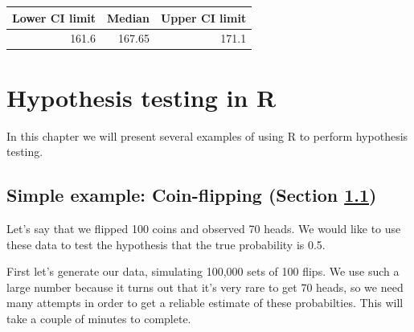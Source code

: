 \documentclass[
  12pt,
]{book}
\begin{document}
\begin{tabular}{r|r|r}
\hline
Lower CI limit & Median & Upper CI limit\\
\hline
161.6 & 167.65 & 171.1\\
\hline
\end{tabular}

\hypertarget{hypothesis-testing-in-r}{%
\chapter{Hypothesis testing in R}\label{hypothesis-testing-in-r}}

In this chapter we will present several examples of using R to perform hypothesis testing.

\hypertarget{randomization-very-simple}{%
\section{Simple example: Coin-flipping (Section \ref{randomization-very-simple})}\label{randomization-very-simple}}

Let's say that we flipped 100 coins and observed 70 heads. We would like to use these data to test the hypothesis that the true probability is 0.5.

First let's generate our data, simulating 100,000 sets of 100 flips. We use such a large number because it turns out that it's very rare to get 70 heads, so we need many attempts in order to get a reliable estimate of these probabilties. This will take a couple of minutes to complete.
\end{document}
